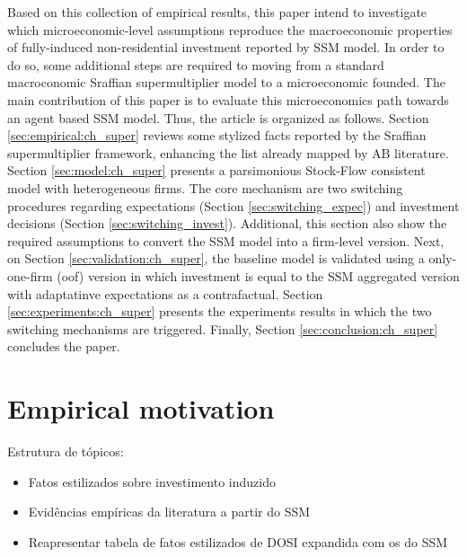 \documentclass{SelfArx}
\begin{document}
Based on this collection of empirical results, this paper intend to investigate which microeconomic-level assumptions reproduce the macroeconomic properties of fully-induced non-residential investment reported by SSM model.
In order to do so, some additional steps are required to moving from a standard macroconomic Sraffian supermultiplier model to a microeconomic founded.
The main contribution of this paper is to evaluate this microeconomics path towards an agent based SSM model.
Thus, the article is organized as follows.
Section \ref{sec:empirical:ch_super} reviews some stylized facts reported by the Sraffian supermultiplier framework, enhancing the list already mapped by AB literature.
Section \ref{sec:model:ch_super} presents a parsimonious Stock-Flow consistent model with heterogeneous firms.
The core mechanism are two switching procedures regarding expectations (Section \ref{sec:switching_expec}) and investment decisions (Section \ref{sec:switching_invest}).
Additional, this section also show the required assumptions to convert the SSM model into a firm-level version.
Next, on Section \ref{sec:validation:ch_super}, the baseline model is validated using a only-one-firm (oof) version in which investment is equal to the SSM aggregated version with adaptatinve expectations as a contrafactual.
Section \ref{sec:experiments:ch_super} presents the experiments results in which the two switching mechanisms are triggered.
Finally, Section \ref{sec:conclusion:ch_super} concludes the paper.


\section{Empirical motivation}
\label{sec:empirical_ch_super}
Estrutura de tópicos:

\begin{itemize}
\item Fatos estilizados sobre investimento induzido
\item Evidências empíricas da literatura a partir do SSM
\item Reapresentar tabela de fatos estilizados de DOSI expandida com os do SSM
\end{itemize}


\end{document}
